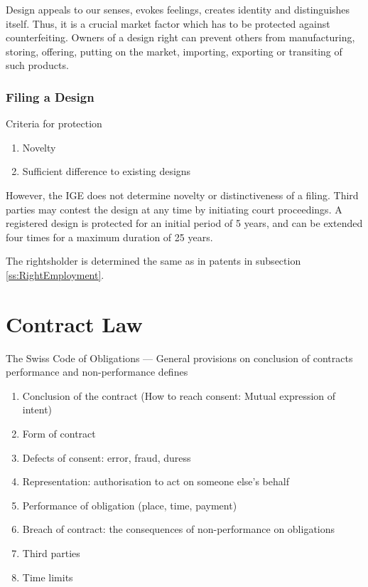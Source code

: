 \documentclass[11pt]{article}
\theoremstyle{definition}
\begin{document}
Design appeals to our senses, evokes feelings, creates identity and distinguishes itself. Thus, it is a crucial market factor which has to be protected against counterfeiting. Owners of a design right can prevent others from manufacturing, storing, offering, putting on the market, importing, exporting or transiting of such products.

\subsubsection{Filing a Design}
Criteria for protection
\begin{enumerate}
	\item Novelty
	\item Sufficient difference to existing designs
\end{enumerate}
However, the IGE does not determine novelty or distinctiveness of a filing. Third parties may contest the design at any time by initiating court proceedings. A registered design is protected for an initial period of 5 years, and can be extended four times for a maximum duration of 25 years.

The rightsholder is determined the same as in patents in subsection \ref{ss:RightEmployment}.

\section{Contract Law}
The Swiss Code of Obligations — General provisions on conclusion of contracts performance and non-performance defines
\begin{enumerate}[nosep]
	\item Conclusion of the contract (How to reach consent: Mutual expression of intent)
	\item Form of contract
	\item Defects of consent: error, fraud, duress
	\item Representation: authorisation to act on someone else's behalf
	\item Performance of obligation (place, time, payment)
	\item Breach of contract: the consequences of non-performance on obligations
	\item Third parties
	\item Time limits
\end{enumerate}
\end{document}
